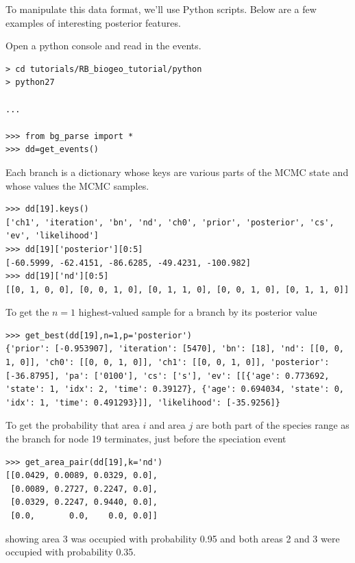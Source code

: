 \documentclass[11pt]{article}
\begin{document}
To manipulate this data format, we'll use Python scripts. Below are a few examples of interesting posterior features.

Open a python console and read in the events.

\begin{snugshade}
\begin{lstlisting}
> cd tutorials/RB_biogeo_tutorial/python
> python27

...

>>> from bg_parse import *
>>> dd=get_events()
\end{lstlisting}
\end{snugshade}


Each branch is a dictionary whose keys are various parts of the MCMC state and whose values the MCMC samples.
\begin{snugshade}
\begin{lstlisting}
>>> dd[19].keys()
['ch1', 'iteration', 'bn', 'nd', 'ch0', 'prior', 'posterior', 'cs', 'ev', 'likelihood']
>>> dd[19]['posterior'][0:5]
[-60.5999, -62.4151, -86.6285, -49.4231, -100.982]
>>> dd[19]['nd'][0:5]
[[0, 1, 0, 0], [0, 0, 1, 0], [0, 1, 1, 0], [0, 0, 1, 0], [0, 1, 1, 0]]
\end{lstlisting}
\end{snugshade}

To get the $n=1$ highest-valued sample for a branch by its posterior value
\begin{snugshade}
\begin{lstlisting}
>>> get_best(dd[19],n=1,p='posterior')
{'prior': [-0.953907], 'iteration': [5470], 'bn': [18], 'nd': [[0, 0, 1, 0]], 'ch0': [[0, 0, 1, 0]], 'ch1': [[0, 0, 1, 0]], 'posterior': [-36.8795], 'pa': ['0100'], 'cs': ['s'], 'ev': [[{'age': 0.773692, 'state': 1, 'idx': 2, 'time': 0.39127}, {'age': 0.694034, 'state': 0, 'idx': 1, 'time': 0.491293}]], 'likelihood': [-35.9256]}
\end{lstlisting}
\end{snugshade}

To get the probability that area $i$ and area $j$ are both part of the species range as the branch for node 19 terminates, just before the speciation event
\begin{snugshade}
\begin{lstlisting}
>>> get_area_pair(dd[19],k='nd')
[[0.0429, 0.0089, 0.0329, 0.0],
 [0.0089, 0.2727, 0.2247, 0.0],
 [0.0329, 0.2247, 0.9440, 0.0],
 [0.0,       0.0,    0.0, 0.0]]
\end{lstlisting}
\end{snugshade}
showing area 3 was occupied with probability 0.95 and both areas 2 and 3 were occupied with probability 0.35.
\end{document}
